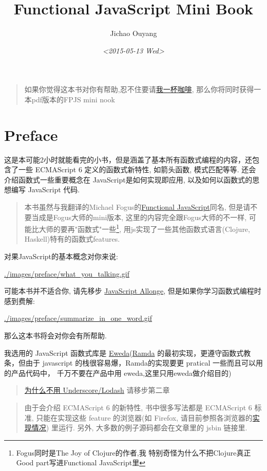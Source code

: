 \documentclass[a5paper]{book}
\author{Jichao Ouyang}
\date{\textit{<2015-05-13 Wed>}}
\title{Functional JavaScript Mini Book}
\begin{document}
\maketitle
\tableofcontents

\begin{quote}
如果你觉得这本书对你有帮助,忍不住要请\href{https://gum.co/fpjs}{我一杯咖啡}, 那么你将同时获得一本pdf版本的FPJS mini nook
\end{quote}

\part{Preface}
\label{sec:orgheadline1}
这是本可能2小时就能看完的小书，但是涵盖了基本所有函数式编程的内容，还包含了一些
ECMAScript 6 定义的函数式新特性, 如箭头函数, 模式匹配等等.
还会介绍函数式一些重要概念在 JavaScript是如何实现即应用,
以及如何以函数式的思想编写 JavaScript 代码.

\begin{quote}
本书虽然与我翻译的Michael Fogus的\href{http://book.douban.com/subject/22733640/}{Functional JavaScript}同名, 但是请不要当成是Fogus大师的mini版本, 
这里的内容完全跟Fogus大师的不一样, 可能比大师的要再"函数式"一些\footnote{Fogus同时是The Joy of Clojure的作者,我
特别奇怪为什么不把Clojure真正Good part写进Functional JavaScript里}, 用js实现了一些其他函数式语言(Clojure, Haskell)特有的函数式features.
\end{quote}

对果JavaScript的基本概念对你来说:

\url{./images/preface/what_you_talking.gif}

可能本书并不适合你, 请先移步 \href{https://leanpub.com/javascript-allonge}{JavaScript Allonge},
但是如果你学习函数式编程时感到费解:

\url{./images/preface/summarize_in_one_word.gif}

那么这本书将会对你会有所帮助.

我选用的 JavaScript 函数式库是
\href{https://rawgit.com/CrossEye/eweda/master/docs/eweda.html}{Eweda}(\href{https://ramdajs.com}{Ramda} 的最初实现，更遵守函数式教条，但由于
javascript 的栈很容易爆，Ramda的实现要更 pratical
一些而且可以用的产品代码中， 千万不要在产品中用
eweda,这里只用eweda做介绍目的)

\begin{quote}
\href{http://fr.umio.us/why-ramda/}{为什么不用 Underscore/Lodash} 请移步第二章
\end{quote}

\begin{quote}
由于会介绍 ECMAScript 6 的新特性, 书中很多写法都是 ECMAScript
6 标准, 只能在实现这些 feature 的浏览器(如 Firefox,
请目前参照各浏览器的\href{http://kangax.github.io/compat-table/es6/}{实现情况}) 里运行.
另外, 大多数的例子源码都会在文章里的 jsbin 链接里.
\end{quote}
\end{document}
